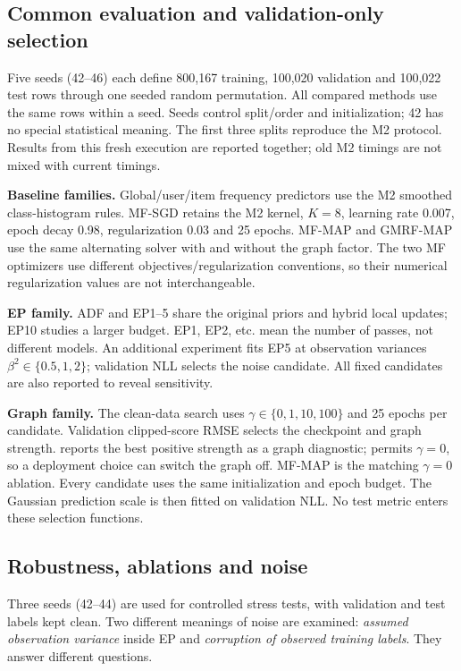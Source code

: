 \subsection{Common evaluation and validation-only selection}
Five seeds (42--46) each define 800,167 training, 100,020 validation and
100,022 test rows through one seeded random permutation. All compared methods
use the same rows within a seed. Seeds control split/order and initialization;
42 has no special statistical meaning. The first three splits reproduce the
M2 protocol. Results from this fresh execution are reported together; old M2
timings are not mixed with current timings.

\textbf{Baseline families.} Global/user/item frequency predictors use the M2
smoothed class-histogram rules. MF-SGD retains the M2 kernel, $K=8$,
learning rate 0.007, epoch decay 0.98, regularization 0.03 and 25 epochs.
MF-MAP and GMRF-MAP use the same alternating solver with and without the
graph factor. The two MF optimizers use different objectives/regularization
conventions, so their numerical regularization values are not interchangeable.

\textbf{EP family.} ADF and EP1--5 share the original priors and hybrid local
updates; EP10 studies a larger budget. EP1, EP2, etc. mean the number of passes,
not different models. An additional experiment fits EP5 at observation
variances $\beta^2\in\{0.5,1,2\}$; validation NLL selects the noise candidate.
All fixed candidates are also reported to reveal sensitivity.

\textbf{Graph family.} The clean-data search uses
$\gamma\in\{0,1,10,100\}$ and 25 epochs per candidate. Validation clipped-score
RMSE selects the checkpoint and graph strength.  reports the
best positive strength as a graph diagnostic;  permits
$\gamma=0$, so a deployment choice can switch the graph off. MF-MAP is the
matching $\gamma=0$ ablation. Every candidate uses the same initialization and
epoch budget. The Gaussian prediction scale is then fitted on validation NLL.
No test metric enters these selection functions.

\subsection{Robustness, ablations and noise}
Three seeds (42--44) are used for controlled stress tests, with validation and
test labels kept clean. Two different meanings of noise are examined:
\emph{assumed observation variance} inside EP and \emph{corruption of observed
training labels}. They answer different questions.

